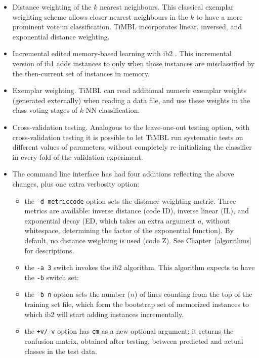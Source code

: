 \documentclass{report}
\begin{document}
\begin{itemize}

\item Distance weighting of the $k$ nearest neighbours. This classical
exemplar weighting scheme \cite{Dudani76} allows closer nearest
neighbours in the $k$ to have a more prominent vote in
classification. TiMBL incorporates linear, inversed, and exponential
distance weighting.

\item Incremental edited memory-based learning with {\sc ib2}
\cite{Aha+91}. This incremental version of {\sc ib1} adds instances to
only when those instances are misclassified by the then-current set of
instances in memory.

\item Exemplar weighting. TiMBL can read additional numeric exemplar
weights (generated externally) when reading a data file, and use these
weights in the class voting stages of $k$-NN classification.

\item Cross-validation testing. Analogous to the leave-one-out testing
option, with cross-validation testing it is possible to let TiMBL run
systematic tests on different values of parameters, without completely
re-initializing the classifier in every fold of the validation experiment.

\item The command line interface has had four additions reflecting
the above changes, plus one extra verbosity option:

\begin{itemize} 
	\item the {\tt -d metriccode} option sets the distance 
              weighting metric. Three metrics are available: 
              inverse distance (code ID), inverse linear (IL),
              and exponential decay (ED, which takes an extra
              argument $a$, without whitespace, determining the
              factor of the exponential function). By default,
              no distance weighting is used (code Z). See
              Chapter~\ref{algorithms} for descriptions.
	\item the {\tt -a 3} switch invokes the {\sc ib2} algorithm.
              This algorithm expects to have the {\tt -b} switch set:
	\item the {\tt -b n} option sets the number ($n$) of lines
              counting from the top of the training set file, which form
              the bootstrap set of memorized instances to which {\sc ib2} 
              will start adding instances incrementally.
	\item the {\tt +v/-v} option has {\tt cm} as a new optional
              argument; it returns the confusion matrix, obtained
              after testing, between predicted and actual classes in 
              the test data.
\end{itemize}


\end{itemize}
\end{document}
